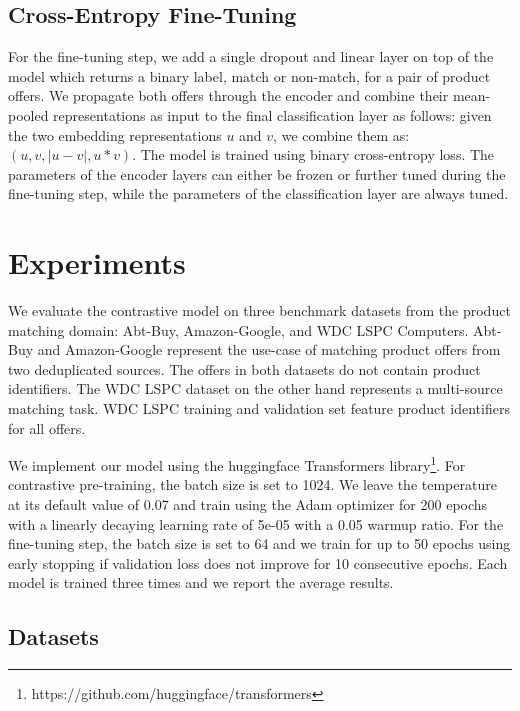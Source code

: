 \documentclass[sigconf]{acmart}
\begin{document}
\subsection{Cross-Entropy Fine-Tuning}
\label{subsec:finetunestep}

For the fine-tuning step, we add a single dropout and linear layer on top of the model which returns a binary label, match or non-match, for a pair of product offers. We propagate both offers through the encoder and combine their mean-pooled representations as input to the final classification layer as follows: given the two embedding representations $u$ and $v$, we combine them as: $(u,v,|u-v|,u*v)$. The model is trained using binary cross-entropy loss. The parameters of the encoder layers can either be frozen or further tuned during the fine-tuning step, while the parameters of the classification layer are always tuned.

\section{Experiments}
\label{sec:experiments}
We evaluate the contrastive model on three benchmark datasets from the product matching domain: Abt-Buy, Amazon-Google, and WDC LSPC Computers. Abt-Buy and Amazon-Google represent the use-case of matching product offers from two deduplicated sources. The offers in both datasets do not contain product identifiers. The WDC LSPC dataset on the other hand represents a multi-source matching task. WDC LSPC training and validation set feature product identifiers for all offers. 

We implement our model using the huggingface Transformers library\footnote{https://github.com/huggingface/transformers}. For contrastive pre-training, the batch size is set to 1024. We leave the temperature at its default value of 0.07 and train using the Adam optimizer for 200 epochs with a linearly decaying learning rate of 5e-05 with a 0.05 warmup ratio. For the fine-tuning step, the batch size is set to 64 and we train for up to 50 epochs using early stopping if validation loss does not improve for 10 consecutive epochs. Each model is trained three times and we report the average results.

\subsection{Datasets}
\label{subsec:datasets}
\end{document}
